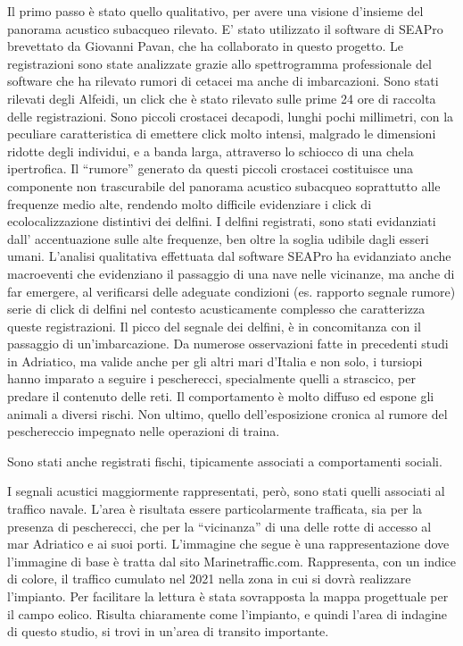 Il primo passo è stato quello qualitativo, per avere una visione d’insieme del panorama acustico subacqueo rilevato.
E' stato utilizzato il software di SEAPro brevettato da Giovanni Pavan, che ha collaborato in questo progetto. 
Le registrazioni sono state analizzate grazie allo spettrogramma professionale del software che ha rilevato rumori di cetacei ma anche di imbarcazioni. 
Sono stati rilevati degli Alfeidi, un click che è stato rilevato sulle prime 24 ore di raccolta delle registrazioni. Sono piccoli crostacei decapodi, lunghi pochi millimetri, con la peculiare caratteristica di emettere click molto intensi, malgrado le dimensioni ridotte degli individui, e a banda larga, attraverso lo schiocco di una chela ipertrofica. %
Il “rumore” generato da questi piccoli crostacei costituisce una componente non trascurabile del panorama acustico subacqueo soprattutto alle frequenze medio alte, rendendo molto difficile evidenziare i click di ecolocalizzazione distintivi dei delfini.
I delfini registrati, sono stati evidanziati dall' accentuazione sulle alte frequenze, ben oltre la soglia udibile dagli esseri umani. 
L'analisi qualitativa effettuata dal software SEAPro ha evidanziato anche macroeventi che evidenziano il passaggio di una nave nelle vicinanze, ma anche di far emergere, al verificarsi delle adeguate condizioni (es. rapporto segnale rumore) 
serie di click di delfini nel contesto acusticamente complesso che caratterizza queste registrazioni. 
Il picco del segnale dei delfini, è in concomitanza con il passaggio di un'imbarcazione. 
Da numerose osservazioni fatte in precedenti studi in Adriatico, ma valide anche per gli altri mari d’Italia e non solo, i tursiopi hanno imparato a seguire i pescherecci, specialmente quelli a strascico, per predare il contenuto delle reti. 
Il comportamento è molto diffuso ed espone gli animali a diversi rischi. Non ultimo, quello dell’esposizione cronica al rumore del peschereccio impegnato nelle operazioni di traina.

Sono stati anche registrati fischi, tipicamente associati a comportamenti sociali. 

I segnali acustici maggiormente rappresentati, però, sono stati quelli associati al traffico navale. 
L’area è risultata essere particolarmente trafficata, sia per la presenza di pescherecci, che per la “vicinanza” di una delle rotte di accesso al mar Adriatico e ai suoi porti.
L’immagine che segue è una rappresentazione dove l’immagine di base è tratta dal sito Marinetraffic.com. 
Rappresenta, con un indice di colore, il traffico cumulato nel 2021 nella zona in cui si dovrà realizzare l’impianto. 
Per facilitare la lettura è stata sovrapposta la mappa progettuale per il campo eolico. 
Risulta chiaramente come l’impianto, e quindi l’area di indagine di questo studio, si trovi in un’area di transito importante. 

